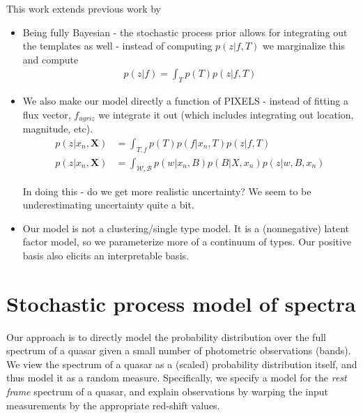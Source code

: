 \documentclass[11pt]{article}
\begin{document}
This work extends previous work by 
\begin{itemize}
\item Being fully Bayesian - the stochastic process prior allows for integrating out the templates as well - instead of computing $p(z | f, T)$ we marginalize this and compute
\begin{align}
  p(z | f) = \int_T p(T) p(z | f, T) 
\end{align}

\item {} We also make our model directly a function of PIXELS - instead of fitting a flux vector, $f_{ugriz}$ we integrate it out (which includes integrating out location, magnitude, etc).    
\begin{align}
  p(z | x_n, \mathbf{X}) &= \int_{T, f} p(T) p(f | x_n, T) p(z | f, T) \\
  p(z | x_n, \mathbf{X}) &= \int_{\mathcal{W}, \mathcal{B}} p(w | x_n, B) p(B | X, x_n) p(z | w, B, x_n)
\end{align}

In doing this - do we get more realistic uncertainty?  We seem to be underestimating uncertainty quite a bit.  

\item Our model is not a clustering/single type model.  It is a (nonnegative) latent factor model, so we parameterize more of a continuum of types.  Our positive basis also elicits an interpretable basis.  



\end{itemize}





\section{Stochastic process model of spectra}

Our approach is to directly model the probability distribution over the full spectrum of a quasar given a small number of photometric observations (bands).  We view the spectrum of a quasar as a (scaled) probability distribution itself, and thus model it as a random measure.  Specifically, we specify a model for the \emph{rest frame} spectrum of a quasar, and explain observations by warping the input measurements by the appropriate red-shift values. 
\end{document}
